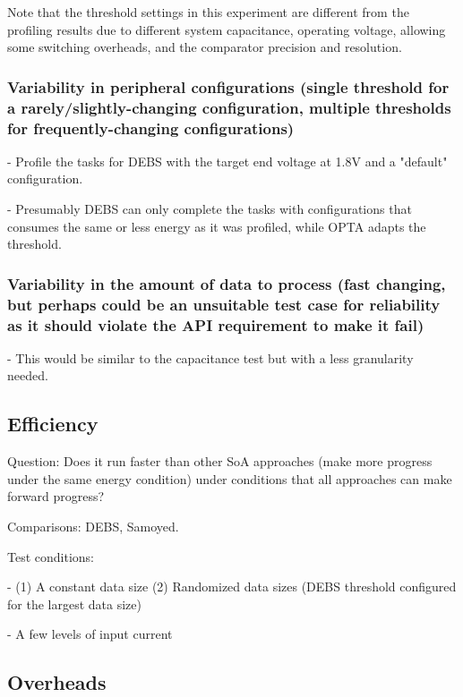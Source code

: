 Note that the threshold settings in this experiment are different from the profiling results due to different system capacitance, operating voltage, allowing some switching overheads, and the comparator precision and resolution. 

\subsubsection{Variability in peripheral configurations (single threshold for a rarely/slightly-changing configuration, multiple thresholds for frequently-changing configurations)}

- Profile the tasks for DEBS with the target end voltage at 1.8V and a "default" configuration. 
    
- Presumably DEBS can only complete the tasks with configurations that consumes the same or less energy as it was profiled, while OPTA adapts the threshold. 

\subsubsection{Variability in the amount of data to process (fast changing, but perhaps could be an unsuitable test case for reliability as it should violate the API requirement to make it fail)}
    
- This would be similar to the capacitance test but with a less granularity needed.




\subsection{Efficiency}

Question: Does it run faster than other SoA approaches (make more progress under the same energy condition) under conditions that all approaches can make forward progress?

Comparisons: DEBS, Samoyed.

Test conditions:
    
- (1) A constant data size (2) Randomized data sizes (DEBS threshold configured for the largest data size)

- A few levels of input current

\subsection{Overheads}

